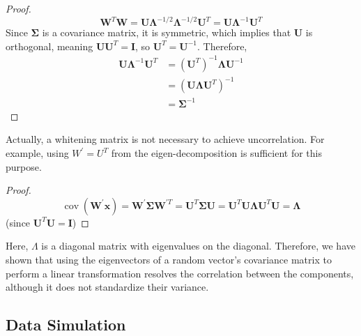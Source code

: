 \documentclass[12pt]{article}
\begin{document}
\begin{proof}
  \[
    \mathbf{W}^T \mathbf{W}=\mathbf{U} \boldsymbol{\Lambda}^{-1 / 2} \boldsymbol{\Lambda}^{-1 / 2} \mathbf{U}^T=\mathbf{U} \boldsymbol{\Lambda}^{-1} \mathbf{U}^T
  \]
  Since \( \boldsymbol{\Sigma} \) is a covariance matrix, it is symmetric, which implies that \( \mathbf{U} \) is orthogonal, meaning \( \mathbf{U U}^T = \mathbf{I} \), so \( \mathbf{U}^T = \mathbf{U}^{-1} \). Therefore,
  \[
    \begin{aligned}
      \mathbf{U} \boldsymbol{\Lambda}^{-1} \mathbf{U}^T & = \left(\mathbf{U}^T\right)^{-1} \boldsymbol{\Lambda} \mathbf{U}^{-1} \\
                                                        & = \left(\mathbf{U} \boldsymbol{\Lambda} \mathbf{U}^T\right)^{-1} \\
                                                        & = \boldsymbol{\Sigma}^{-1}
  \end{aligned}
  \]
\end{proof}

Actually, a whitening matrix is not necessary to achieve uncorrelation. For example, using \( W^{\prime} = U^T \) from the eigen-decomposition is sufficient for this purpose.

\begin{proof}
  \[
    \operatorname{cov}\left(\mathbf{W}^{\prime} \mathbf{x}\right)=\mathbf{W}^{\prime} \boldsymbol{\Sigma} \mathbf{W}^{\prime T}=\mathbf{U}^T \boldsymbol{\Sigma} \mathbf{U}=\mathbf{U}^T \mathbf{U} \boldsymbol{\Lambda} \mathbf{U}^T \mathbf{U}=\boldsymbol{\Lambda}
  \]
  (since \( \mathbf{U}^T \mathbf{U}=\mathbf{I} \))
\end{proof}

Here, \( \Lambda \) is a diagonal matrix with eigenvalues on the diagonal. Therefore, we have shown that using the eigenvectors of a random vector's covariance matrix to perform a linear transformation resolves the correlation between the components, although it does not standardize their variance.




\subsection*{Data Simulation}
\end{document}
